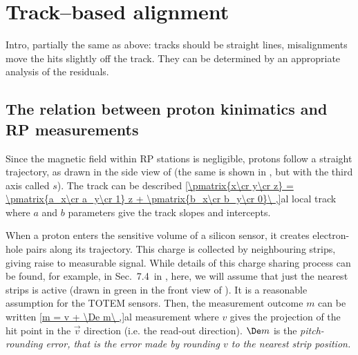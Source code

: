\section[al tb]{Track--based alignment}

Intro, partially the same as above: tracks should be straight lines, misalignments move the hits slightly off the track. They can be determined by an appropriate analysis of the residuals.


\subsection[al psi]{The relation between proton kinimatics and RP measurements}

Since the magnetic field within RP stations is negligible, protons follow a straight trajectory, as drawn in the side view of  (the same is shown in , but with the third axis called $s$). The track can be described
\eqref{\pmatrix{x\cr y\cr z} = \pmatrix{a_x\cr a_y\cr 1} z + \pmatrix{b_x\cr b_y\cr 0}\ ,}{al local track}
where $a$ and $b$ parameters give the track slopes and intercepts.

When a proton enters the sensitive volume of a silicon sensor, it creates electron-hole pairs along its trajectory. This charge is collected by neighbouring strips, giving raise to measurable signal. While details of this charge sharing process can be found, for example, in Sec.~7.4~in , here, we will assume that just the nearest strips is active (drawn in green in the front view of ). It is a reasonable assumption for the TOTEM sensors. Then, the measurement outcome $m$ can be written
\eqref{m = v + \De m\ ,}{al measurement}
where $v$ gives the projection of the hit point in the $\vec v$ direction (i.e. the read-out direction). $\De m$ is the \em{pitch-rounding error}, that is the error made by rounding $v$ to the nearest strip position.


